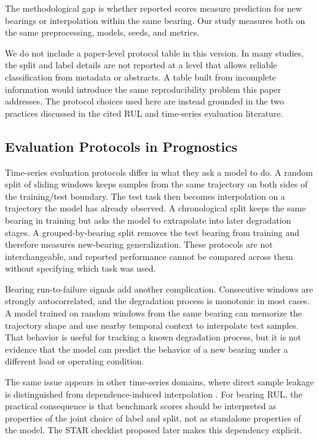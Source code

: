 \documentclass[pdflatex,sn-mathphys-num]{sn-jnl}
\begin{document}
The methodological gap is whether reported scores measure prediction for new bearings or interpolation within the same bearing. Our study measures both on the same preprocessing, models, seeds, and metrics.

We do not include a paper-level protocol table in this version. In many studies, the split and label details are not reported at a level that allows reliable classification from metadata or abstracts. A table built from incomplete information would introduce the same reproducibility problem this paper addresses. The protocol choices used here are instead grounded in the two practices discussed in the cited RUL and time-series evaluation literature.

\subsection{Evaluation Protocols in Prognostics}
Time-series evaluation protocols differ in what they ask a model to do. A random split of sliding windows keeps samples from the same trajectory on both sides of the training/test boundary. The test task then becomes interpolation on a trajectory the model has already observed. A chronological split keeps the same bearing in training but asks the model to extrapolate into later degradation stages. A grouped-by-bearing split removes the test bearing from training and therefore measures new-bearing generalization. These protocols are not interchangeable, and reported performance cannot be compared across them without specifying which task was used.

Bearing run-to-failure signals add another complication. Consecutive windows are strongly autocorrelated, and the degradation process is monotonic in most cases. A model trained on random windows from the same bearing can memorize the trajectory shape and use nearby temporal context to interpolate test samples. That behavior is useful for tracking a known degradation process, but it is not evidence that the model can predict the behavior of a new bearing under a different load or operating condition.

The same issue appears in other time-series domains, where direct sample leakage is distinguished from dependence-induced interpolation \cite{leakage_nature,leakage_frontiers}. For bearing RUL, the practical consequence is that benchmark scores should be interpreted as properties of the joint choice of label and split, not as standalone properties of the model. The STAR checklist proposed later makes this dependency explicit.
\end{document}
